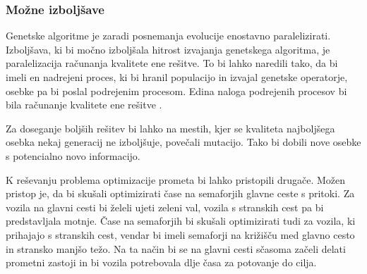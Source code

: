 \documentclass[a4paper, 12pt]{book}
\begin{document}
\subsubsection{Mo\v zne izbolj\v save}

Genetske algoritme je zaradi posnemanja evolucije enostavno paralelizirati. Izbolj\v sava, ki bi mo\v cno izbolj\v sala hitrost izvajanja genetskega algoritma, je paralelizacija ra\v cunanja kvalitete ene re\v sitve. To bi lahko naredili tako, da bi imeli en nadrejeni proces, ki bi hranil populacijo in izvajal genetske operatorje, osebke pa bi poslal podrejenim procesom. Edina naloga podrejenih procesov bi bila ra\v cunanje kvalitete ene re\v sitve
\cite{http://tracer.uc3m.es/tws/cEA/documents/cant98.pdf}.

Za doseganje bolj\v sih re\v sitev bi lahko na mestih, kjer se kvaliteta najbolj\v sega osebka nekaj generacij ne izbolj\v suje, pove\v cali mutacijo. Tako bi dobili nove osebke s potencialno novo informacijo.

K re\v sevanju problema optimizacije prometa bi lahko pristopili druga\v ce. Mo\v zen pristop je, da bi sku\v sali optimizirati \v case na semaforjih glavne ceste s pritoki. Za vozila na glavni cesti bi \v zeleli ujeti zeleni val, vozila s stranskih cest pa bi predstavljala motnje. \v Case na semaforjih bi sku\v sali optimizirati tudi za vozila, ki prihajajo s stranskih cest, vendar bi imeli semaforji na kri\v zi\v s\v cu med glavno cesto in stransko manj\v so te\v zo. Na ta na\v cin bi se na glavni cesti s\v casoma za\v celi delati prometni zastoji in bi vozila potrebovala dlje \v casa za potovanje do cilja. 
 
\end{document}
